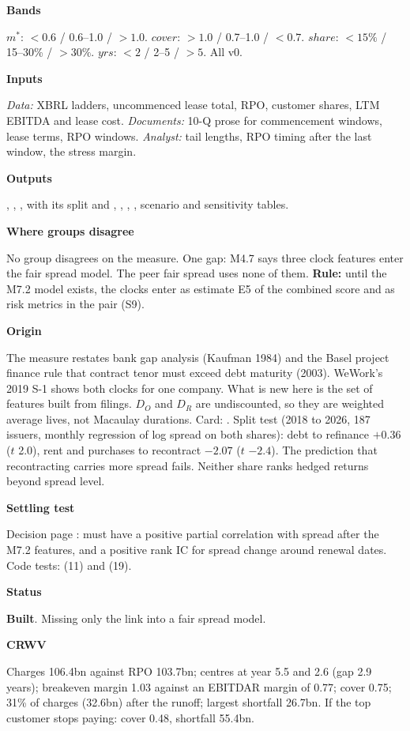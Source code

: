 \documentclass[11pt]{article}
\newcommand{\stbuilt}{\textcolor{good}{\textbf{Built}}}
\newcommand{\fld}[1]{\par\medskip\noindent\textbf{\textcolor{steel}{#1}}\par\nopagebreak}
\begin{document}
\fld{Bands} $m^{*}$: $<0.6$ / 0.6--1.0 / $>1.0$. $cover$: $>1.0$ / 0.7--1.0 / $<0.7$. $share$: $<15\%$ / 15--30\% / $>30\%$. $yrs$: $<2$ / 2--5 / $>5$. All v0.

\fld{Inputs} \emph{Data:} XBRL ladders, uncommenced lease total, RPO, customer shares, LTM EBITDA and lease cost. \emph{Documents:} 10-Q prose for commencement windows, lease terms, RPO windows. \emph{Analyst:} tail lengths, RPO timing after the last window, the stress margin.

\fld{Outputs} , , ,  with its split  and , , , , scenario and sensitivity tables.

\fld{Where groups disagree} No group disagrees on the measure. One gap: M4.7 says three clock features enter the fair spread model. The peer fair spread uses none of them. \textbf{Rule:} until the M7.2 model exists, the clocks enter as estimate E5 of the combined score and as risk metrics in the pair (S9).

\fld{Origin} The measure restates bank gap analysis (Kaufman 1984) and the Basel project finance rule that contract tenor must exceed debt maturity (2003). WeWork's 2019 S-1 shows both clocks for one company. What is new here is the set of features built from filings. $D_O$ and $D_R$ are undiscounted, so they are weighted average lives, not Macaulay durations. Card: . Split test (2018 to 2026, 187 issuers, monthly regression of log spread on both shares): debt to refinance $+0.36$ ($t$ 2.0), rent and purchases to recontract $-2.07$ ($t$ $-2.4$). The prediction that recontracting carries more spread fails. Neither share ranks hedged returns beyond spread level.

\fld{Settling test} Decision page :  must have a positive partial correlation with spread after the M7.2 features, and a positive rank IC for spread change around renewal dates. Code tests:  (11) and  (19).

\fld{Status} \stbuilt. Missing only the link into a fair spread model.

\fld{CRWV} Charges 106.4bn against RPO 103.7bn; centres at year 5.5 and 2.6 (gap 2.9 years); breakeven margin 1.03 against an EBITDAR margin of 0.77; cover 0.75; 31\% of charges (32.6bn) after the runoff; largest shortfall 26.7bn. If the top customer stops paying: cover 0.48, shortfall 55.4bn.
\end{document}
